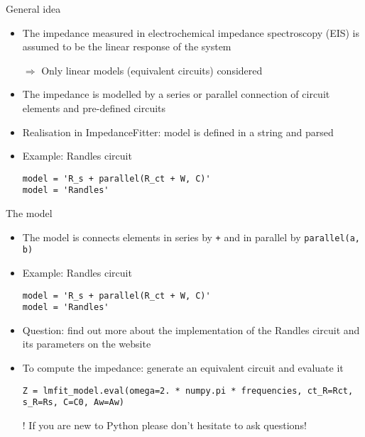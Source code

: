 \documentclass[11pt]{beamer}
\begin{document}
\begin{frame}[fragile]{General idea}

\begin{itemize}
\item The impedance measured in electrochemical impedance spectroscopy (EIS) is assumed to be the linear response of the system
\item[$\Rightarrow$] Only linear models (equivalent circuits) considered
\item The impedance is modelled by a series or parallel connection of circuit elements and pre-defined circuits
\item Realisation in ImpedanceFitter: model is defined in a string and parsed
\item Example: Randles circuit
\begin{lstlisting}
model = 'R_s + parallel(R_ct + W, C)'
model = 'Randles'
\end{lstlisting}
\end{itemize}

\end{frame}

\begin{frame}[fragile]{The model}

\begin{itemize}
\item The model is connects elements in series by \lstinline{+} and in parallel by \lstinline{parallel(a, b)}
\item Example: Randles circuit
\begin{lstlisting}
model = 'R_s + parallel(R_ct + W, C)'
model = 'Randles'
\end{lstlisting}
\item Question: find out more about the implementation of the Randles circuit and its parameters on the website
\item To compute the impedance: generate an equivalent circuit and evaluate it
\begin{lstlisting}
Z = lmfit_model.eval(omega=2. * numpy.pi * frequencies, ct_R=Rct, s_R=Rs, C=C0, Aw=Aw)
\end{lstlisting}
\item[!] If you are new to Python please don't hesitate to ask questions!
\end{itemize}
\end{frame}
\end{document}
